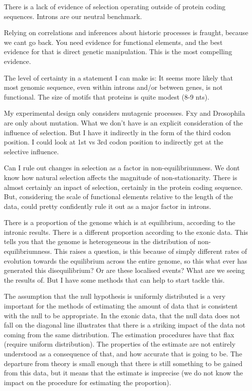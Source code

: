 There is a lack of evidence of selection operating outside of protein coding sequences. 
Introns are our neutral benchmark. 

Relying on correlations and inferences about historic processes is fraught, because we cant go back. You need evidence for functional elements, and the best evidence for that is direct genetic manipulation. This is the most compelling evidence.

The level of certainty in a statement I can make is:
It seems more likely that most genomic sequence, even within introns and/or between genes, is not functional. The size of motifs that proteins is quite modest (8-9 nts). 

My experimental design only considers mutagenic processes. Fxy and Drosophila are only about mutation. What we don't have is an explicit consideration of the influence of selection. But I have it indirectly in the form of the third codon position. I could look at 1st vs 3rd codon position to indirectly get at the selective influence. 

Can I rule out changes in selection as a factor in non-equilibriumness. We dont know how natural selection affects the magnitude of non-stationarity. There is almost certainly an inpact of selection, certainly in the protein coding sequence. But, considering the scale of functional elements relative to the length of the data, could pretty confidently rule it out as a major factor in introns. 


There is a proportion of the genome which is at equilibrium, according to the intronic results. There is a different proportion according to the exonic data. This tells you that the genome is heterogeneous in the distribution of non-equilibriumness. This raises a question, is this because of simply different rates of evolution towards the equilibrium across the entire genome, so this what ever has generated this disequilibrium? Or are these localised events? What are we seeing the results of. But I have some methods that can help to start tackle this. 


The assumption that the null hypothesis is uniformly distributed is a very important for the methods of estimating the amount of data that is consistent with the null to be appropriate. In the exonic data, that the null data does not fall on the diagonal line illustrates that there is a striking impact of the data not coming from the same distribution. The estimation procedures have that flax (require uniform distribution). The properties of the estimate are not entirely understood as a consequence of that, and how accurate that is going to be. The departure from theory is small enough that there is still something to be gained from this data, but it means that the estimate is imprecise (we do not know the impact on the procedure for estimating the proportion). 

